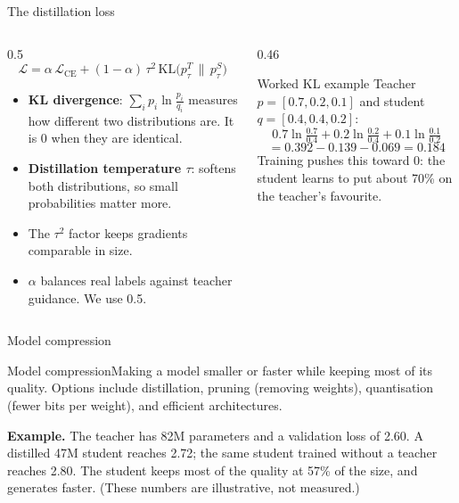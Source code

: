 \documentclass[aspectratio=169,11pt]{beamer}
\newcommand{\term}[3]{%
  \begin{block}{#1}\small #2\par\vspace{1mm}%
  {\color{exgreen}\textbf{Example.}} #3\end{block}}
\begin{document}
\begin{frame}{The distillation loss}
  \begin{columns}[T]
    \begin{column}{0.5\textwidth}
      \small
      \[
        \mathcal{L}=\alpha\,\mathcal{L}_{\text{CE}}+(1-\alpha)\,\tau^2\,\mathrm{KL}\big(p^T_\tau\,\|\,p^S_\tau\big)
      \]
      \begin{itemize}
        \item \textbf{KL divergence}: $\sum_i p_i\ln\frac{p_i}{q_i}$ measures how different two distributions are. It is 0 when they are identical.
        \item \textbf{Distillation temperature $\tau$}: softens both distributions, so small probabilities matter more.
        \item The $\tau^2$ factor keeps gradients comparable in size.
        \item $\alpha$ balances real labels against teacher guidance. We use 0.5.
      \end{itemize}
    \end{column}
    \begin{column}{0.46\textwidth}
      \begin{exampleblock}{Worked KL example}
        \small
        Teacher $p=[0.7,0.2,0.1]$ and student $q=[0.4,0.4,0.2]$:
        \[
          0.7\ln\tfrac{0.7}{0.4}+0.2\ln\tfrac{0.2}{0.4}+0.1\ln\tfrac{0.1}{0.2}
        \]
        \[
          =0.392-0.139-0.069=0.184
        \]
        Training pushes this toward 0: the student learns to put about 70\% on the teacher's favourite.
      \end{exampleblock}
    \end{column}
  \end{columns}
\end{frame}

\begin{frame}{Model compression}
  \term{Model compression}
  {Making a model smaller or faster while keeping most of its quality. Options include distillation, pruning (removing weights), quantisation (fewer bits per weight), and efficient architectures.}
  {The teacher has 82M parameters and a validation loss of 2.60. A distilled 47M student reaches 2.72; the same student trained without a teacher reaches 2.80. The student keeps most of the quality at 57\% of the size, and generates faster. (These numbers are illustrative, not measured.)}
\end{frame}

\end{document}
